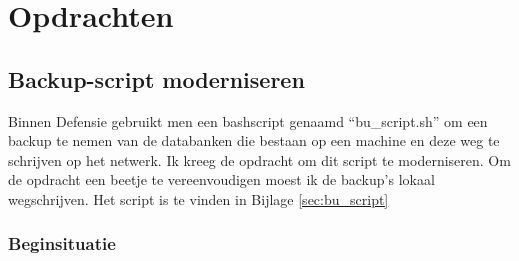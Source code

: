 

\section{Opdrachten}
\label{sec:opdrachten}

\subsection{Backup-script moderniseren}

Binnen Defensie gebruikt men een bashscript genaamd ``bu\_script.sh'' om een backup te nemen van de databanken die bestaan op een machine en deze weg te schrijven op het netwerk.  
Ik kreeg de opdracht om dit script te moderniseren. Om de opdracht een beetje te vereenvoudigen moest ik de backup's lokaal wegschrijven. Het script is te vinden in Bijlage \ref{sec:bu_script}

\subsubsection{Beginsituatie}


